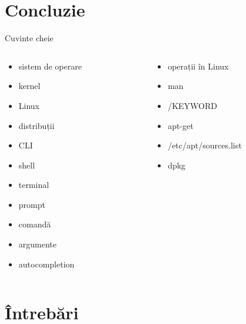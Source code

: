 \documentclass[handout]{beamer}
\begin{document}
\section{Concluzie}

\begin{frame}{Cuvinte cheie}
  \begin{columns}
    \begin{column}[l]{0.5\textwidth}
      \begin{itemize}
        \item sistem de operare
        \item kernel
        \item Linux
        \item distribuții
        \item CLI
        \item shell
        \item terminal
        \item prompt
        \item comandă
        \item argumente
        \item autocompletion
      \end{itemize}
    \end{column}
    \begin{column}[l]{0.5\textwidth}
      \begin{itemize}
        \item operații în Linux
        \item man
        \item /KEYWORD
        \item apt-get
        \item /etc/apt/sources.list
        \item dpkg
      \end{itemize}
    \end{column}
  \end{columns}
\end{frame}


\section{Întrebări}
\end{document}
